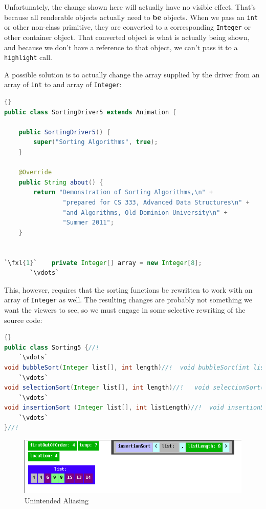 \documentclass[11pt,titlepage]{book}
\def\fxl#1{%
\newdimen\fxlheight\setlength{\fxlheight}{#1\baselineskip}%
\advance\fxlheight by -0.5\baselineskip%
\begin{picture}(0,0)%
\setlength{\unitlength}{\baselineskip}%
\put(0,0){\makebox(0,0.75)[tl]{%
\colorbox{paleyellow}{%
\rule{0pt}{\fxlheight}%
\rule{\linewidth}{0pt}}%
}}\end{picture}%
}
\begin{document}
Unfortunately, the change shown here will actually have no visible
effect.  That's because all renderable objects actually need to {\bf
  be} objects. When we pass an {\tt int} or other non-class primitive,
they are converted to a corresponding {\tt Integer} or other container
object. That converted object is what is actually being shown, and
because we don't have a reference to that object, we can't pass it to
a \texttt{highlight} call.

A possible solution is to actually change the array supplied by the
driver from an array of {\tt int} to and array of {\tt Integer}:
\begin{lstlisting}[language=Java,frame=tb]{}
public class SortingDriver5 extends Animation {

    public SortingDriver5() {
        super("Sorting Algorithms", true);
    }

    @Override
    public String about() {
        return "Demonstration of Sorting Algorithms,\n" +
                "prepared for CS 333, Advanced Data Structures\n" +
                "and Algorithms, Old Dominion University\n" +
                "Summer 2011";
    }

    
`\fxl{1}`    private Integer[] array = new Integer[8];
       `\vdots`
\end{lstlisting}

This, however, requires that the sorting functions be rewritten to
work with an array of {\tt Integer} as well. The resulting changes
are probably not something we want the viewers to see, so we must engage in
some selective rewriting of the source code:
\begin{lstlisting}[language=Java,frame=tb]{}
public class Sorting5 {//!
    `\vdots`
void bubbleSort(Integer list[], int length)//!	void bubbleSort(int list[], int length)
    `\vdots`
void selectionSort(Integer list[], int length)//!	void selectionSort(int list[], int length)
    `\vdots`
void insertionSort (Integer list[], int listLength)//!	void insertionSort (int list[], int listLength)
    `\vdots`
}//!
\end{lstlisting}

\begin{figure}
  \begin{center}
    \includegraphics[scale=0.5]{images/IntegerAliasing}
  \end{center}
  \caption{Unintended Aliasing}\label{IntegerAliasing}
  
\end{figure}
\end{document}
